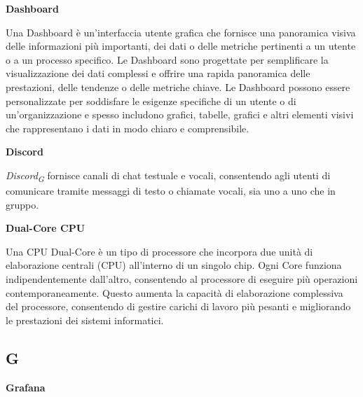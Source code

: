 \vspace{0.4cm}

\textbf{Dashboard}

\vspace{0.1cm}

Una Dashboard è un'interfaccia utente grafica che fornisce una panoramica visiva delle informazioni più importanti, dei dati o delle metriche pertinenti a un utente o a un processo specifico. Le Dashboard sono progettate per semplificare la visualizzazione dei dati complessi e offrire una rapida panoramica delle prestazioni, delle tendenze o delle metriche chiave. Le Dashboard possono essere personalizzate per soddisfare le esigenze specifiche di un utente o di un'organizzazione e spesso includono grafici, tabelle, grafici e altri elementi visivi che rappresentano i dati in modo chiaro e comprensibile.

\vspace{0.4cm}

\textbf{Discord}

\vspace{0.1cm}

\textit{Discord}\textsubscript{\textit{G}} fornisce canali di chat testuale e vocali, consentendo agli utenti di comunicare tramite messaggi di testo o chiamate vocali, sia uno a uno che in gruppo.

\vspace{0.4cm}

\textbf{Dual-Core CPU}

\vspace{0.1cm}

Una CPU Dual-Core è un tipo di processore che incorpora due unità di elaborazione centrali (CPU) all'interno di un singolo chip. Ogni Core funziona indipendentemente dall'altro, consentendo al processore di eseguire più operazioni contemporaneamente. Questo aumenta la capacità di elaborazione complessiva del processore, consentendo di gestire carichi di lavoro più pesanti e migliorando le prestazioni dei sistemi informatici.

\subsection{G}

\vspace{0.4cm}

\textbf{Grafana}

\vspace{0.1cm}


